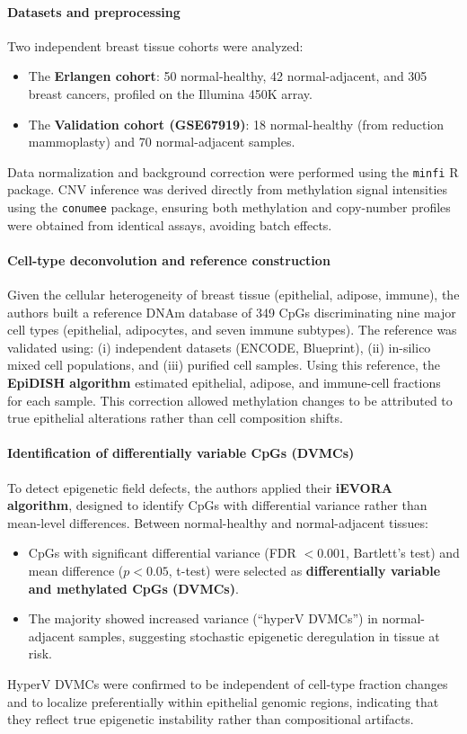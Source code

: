 \documentclass[10pt]{extarticle}
\begin{document}
\paragraph{Datasets and preprocessing}
Two independent breast tissue cohorts were analyzed:
\begin{itemize}[label=-]
\item The \textbf{Erlangen cohort}: 50 normal-healthy, 42 normal-adjacent, and 305 breast cancers, profiled on the Illumina 450K array.
\item The \textbf{Validation cohort (GSE67919)}: 18 normal-healthy (from reduction mammoplasty) and 70 normal-adjacent samples.
\end{itemize}
Data normalization and background correction were performed using the \texttt{minfi} R package. CNV inference was derived directly from methylation signal intensities using the \texttt{conumee} package, ensuring both methylation and copy-number profiles were obtained from identical assays, avoiding batch effects.

\paragraph{Cell-type deconvolution and reference construction}
Given the cellular heterogeneity of breast tissue (epithelial, adipose, immune), the authors built a reference DNAm database of 349 CpGs discriminating nine major cell types (epithelial, adipocytes, and seven immune subtypes). The reference was validated using:
(i) independent datasets (ENCODE, Blueprint), 
(ii) in-silico mixed cell populations, and 
(iii) purified cell samples.  
Using this reference, the \textbf{EpiDISH algorithm} estimated epithelial, adipose, and immune-cell fractions for each sample. This correction allowed methylation changes to be attributed to true epithelial alterations rather than cell composition shifts.

\paragraph{Identification of differentially variable CpGs (DVMCs)}
To detect epigenetic field defects, the authors applied their \textbf{iEVORA algorithm}, designed to identify CpGs with differential variance rather than mean-level differences. Between normal-healthy and normal-adjacent tissues:
\begin{itemize}[label=-]
\item CpGs with significant differential variance (FDR $< 0.001$, Bartlett’s test) and mean difference ($p < 0.05$, t-test) were selected as \textbf{differentially variable and methylated CpGs (DVMCs)}.
\item The majority showed increased variance (“hyperV DVMCs”) in normal-adjacent samples, suggesting stochastic epigenetic deregulation in tissue at risk.
\end{itemize}
HyperV DVMCs were confirmed to be independent of cell-type fraction changes and to localize preferentially within epithelial genomic regions, indicating that they reflect true epigenetic instability rather than compositional artifacts.
\end{document}

